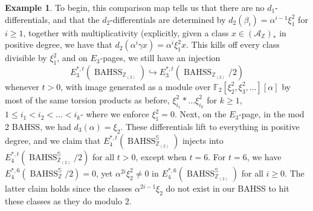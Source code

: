 \documentclass[11pt,leqno]{article}
\newcommand{\zz}{\mathbb{Z}}
\newcommand{\sss}{\mathbb{S}}
\newcommand{\mc}[1]{\mathcal{#1}}
\newcommand{\fff}{\mathbb{F}}
\newcommand{\mo}[1]{\operatorname{#1}}
\newtheorem*{short hand}{theorem name}
\theoremstyle{plain}  %
\theoremstyle{definition}
\newtheorem{example}{Example}[section]
\numberwithin{equation}{section}
\begin{document}
\begin{example}
To begin, this comparison map tells us that there are no $d_1$-differentials, and that the $d_2$-differentials are determined by $d_2(\beta_i)=\alpha^{i-1}\xi_1^2$ for $i\geq 1$, together with multiplicativity (explicitly, given a class $x\in (\mc{A}_{\zz})_*$ in positive degree, we have that $d_2(\alpha^i\gamma x)=\alpha^i\xi_1^2x$.  This kills off every class divisible by $\xi_1^2$, and on $E_3$-pages, we still have an injection $$E_3^{*,t}(\mo{BAHSS}_{\zz_{(2)}})\hookrightarrow E_3^{*,t}(\mo{BAHSS}_{\zz_{(2)}}/2)$$ whenever $t>0$, with image generated as a module over $\fff_2[\xi_2^2,\xi_3^2,\ldots][\alpha]$ by most of the same torsion products as before, $\xi_{i_1}^2*\ldots \xi_{i_k}^2$ for $k\geq 1$, $1\leq i_1<i_2<\ldots <i_k$- where we enforce $\xi_1^2=0$.  Next, on the $E_3$-page, in the mod 2 BAHSS, we had $d_3(\alpha)=\xi_2$.  These differentials lift to everything in positive degree, and we claim that $E_4^{*,t}(\mo{BAHSS}_{\zz_{(2)}}^{\sss})$ injects into $E_4^{*,t}(\mo{BAHSS}_{\zz_{(2)}}^{\sss}/2)$ for all $t>0$, except when $t=6$.  For $t=6$, we have $E_4^{*,6}(\mo{BAHSS}_{\zz}^{\sss}/2)=0$, yet $\alpha^{2i}\xi_2^2\neq 0$ in $E_4^{*,6}(\mo{BAHSS}_{\zz_{(2)}}^{\sss})$ for all $i\geq 0$.  The latter claim holds since the classes $\alpha^{2i-1}\xi_2$ do not exist in our BAHSS to hit these classes as they do modulo 2.  



\end{example}
\end{document}
